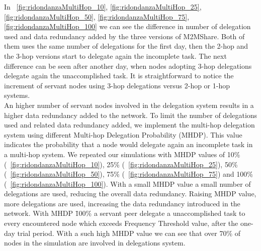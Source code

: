 In \figurename~\ref{fig:ridondanzaMultiHop_10}, \ref{fig:ridondanzaMultiHop_25}, \ref{fig:ridondanzaMultiHop_50}, \ref{fig:ridondanzaMultiHop_75}, \ref{fig:ridondanzaMultiHop_100} we can see the difference in number of delegation used and data redundancy added by the three versions of M2MShare. Both of them uses the same number of delegations for the first day, then the 2-hop and the 3-hop versions start to delegate again the incomplete task. The next difference can be seen after another day, when nodes adopting 3-hop delegations delegate again the unaccomplished task. It is straightforward to notice the increment of servant nodes using 3-hop delegations versus 2-hop or 1-hop systems.
\\

An higher number of servant nodes involved in the delegation system results in a higher data redundancy added to the network. To limit the number of delegations used and related data redundancy added, we implement the multi-hop delegation system using different Multi-hop Delegation Probability (MHDP). This value indicates the probability that a node would delegate again an incomplete task in a multi-hop system. We repeated our simulations with MHDP values of 10\% (\figurename~\ref{fig:ridondanzaMultiHop_10}), 25\% (\figurename~\ref{fig:ridondanzaMultiHop_25}), 50\% (\figurename~\ref{fig:ridondanzaMultiHop_50}), 75\% (\figurename~\ref{fig:ridondanzaMultiHop_75}) and 100\% (\figurename~\ref{fig:ridondanzaMultiHop_100}). With a small MHDP value a small number of delegations are used, reducing the overall data redundancy. Raising MHDP value, more delegations are used, increasing the data redundancy introduced in the network. With MHDP \= 100\% a servant peer delegate a unaccomplished task to every encountered node which exceeds Frequency Threshold value, after the one-day trial period. With a such high MHDP value we can see that over 70\% of nodes in the simulation are involved in delegations system.

